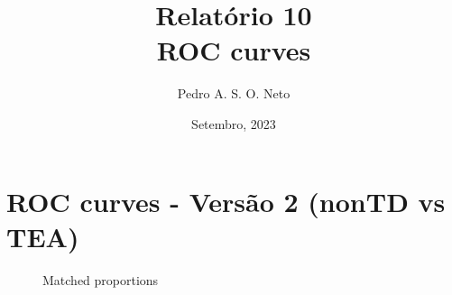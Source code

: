 \documentclass{article}
\title{Relatório 10 \\ ROC curves}
\author{Pedro A. S. O. Neto}
\date{Setembro, 2023}
\begin{document}
\maketitle

\section{ROC curves - Versão 2 (nonTD vs TEA)}

\begin{figure}[H]
  \caption{Matched proportions}
  \noindent{}
  \centering
\end{figure}
\end{document}
